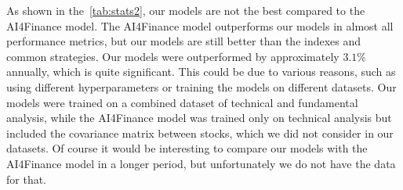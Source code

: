 \documentclass[../xlapes02]{subfiles}
\begin{document}
    As shown in the~\cref{tab:stats2}, our models are not the best compared to the AI4Finance model. The AI4Finance model outperforms our models in almost all performance metrics, but our models are still better than the indexes and common strategies. Our models were outperformed by approximately $3.1\%$ annually, which is quite significant. This could be due to various reasons, such as using different hyperparameters or training the models on different datasets. Our models were trained on a combined dataset of technical and fundamental analysis, while the AI4Finance model was trained only on technical analysis but included the covariance matrix between stocks, which we did not consider in our datasets. Of course it would be interesting to compare our models with the AI4Finance model in a longer period, but unfortunately we do not have the data for that.
\end{document}
